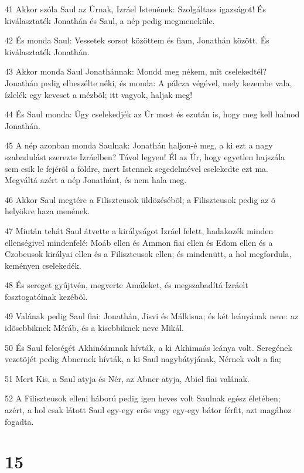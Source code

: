 \par 41 Akkor szóla Saul az Úrnak, Izráel Istenének: Szolgáltass igazságot! És kiválasztaték Jonathán és Saul, a nép pedig megmeneküle.
\par 42 És monda Saul: Vessetek sorsot közöttem és fiam, Jonathán között. És kiválasztaték Jonathán.
\par 43 Akkor monda Saul Jonathánnak: Mondd meg nékem, mit cselekedtél? Jonathán pedig elbeszélte néki, és monda: A pálcza végével, mely kezembe vala, ízlelék egy keveset a mézbõl; itt vagyok, haljak meg!
\par 44 És Saul monda: Úgy cselekedjék az Úr most és ezután is, hogy meg kell halnod Jonathán.
\par 45 A nép azonban monda Saulnak: Jonathán haljon-é meg, a ki ezt a nagy szabadulást szerezte Izráelben? Távol legyen! Él az Úr, hogy egyetlen hajszála sem esik le fejérõl a földre, mert Istennek segedelmével cselekedte ezt ma. Megváltá azért a nép Jonathánt, és nem hala meg.
\par 46 Akkor Saul megtére a Filiszteusok üldözésébõl; a Filiszteusok pedig az õ helyökre haza menének.
\par 47 Miután tehát Saul átvette a királyságot Izráel felett, hadakozék minden ellenségivel mindenfelé: Moáb ellen és Ammon fiai ellen és Edom ellen és a Czobeusok királyai ellen és a Filiszteusok ellen; és mindenütt, a hol megfordula, keményen cselekedék.
\par 48 És sereget gyûjtvén, megverte Amáleket, és megszabadítá Izráelt fosztogatóinak kezébõl.
\par 49 Valának pedig Saul fiai: Jonathán, Jisvi és Málkisua; és két leányának neve: az idõsebbiknek Méráb, és a kisebbiknek neve Mikál.
\par 50 És Saul feleségét Akhinóámnak hívták, a ki Akhimaás leánya volt. Seregének vezetõjét pedig Abnernek hívták, a ki Saul nagybátyjának, Nérnek volt a fia;
\par 51 Mert Kis, a Saul atyja és Nér, az Abner atyja, Abiel fiai valának.
\par 52 A Filiszteusok elleni háború pedig igen heves volt Saulnak egész életében; azért, a hol csak látott Saul egy-egy erõs vagy egy-egy bátor férfit, azt magához fogadta.

\chapter{15}

